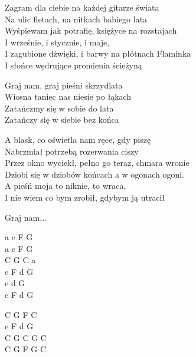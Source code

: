 
\begin{text}
    Zagram dla ciebie na każdej gitarze świata\\
    Na ulic fletach, na nitkach babiego lata\\
    Wyśpiewam jak potrafię, księżyce na rozstajach\\
    I wrześnie, i stycznie, i maje,\\
    I zagubione dźwięki, i barwy na płótnach Flaminka\\
    I słońce wędrujące promienia ścieżyną

    \vin Graj nam, graj pieśni skrzydlata\\
    \vin Wiosna taniec nas niesie po łąkach\\
    \vin Zatańczmy się w sobie do lata\\
    \vin Zatańczy się w siebie bez końca

    A blask, co oświetla nam ręce, gdy piszę\\
    Nabrzmiał potrzebą rozerwania ciszy\\
    Przez okno wyciekł, pełno go teraz, chmara wronie\\
    Dziobi się w dziobów końcach a w ogonach ogoni.\\
    A pieśń moja to niknie, to wraca,\\
    I nie wiem co bym zrobił, gdybym ją utracił
    
    \vin Graj nam...
\end{text}
\begin{chord}
    a e F G\\
    a e F G\\
    C G C a\\
    e F d G\\
    e d G\\
    e F d G

    C G F C\\
    e F d G\\
    C G C G C\\
    C G F G C
\end{chord}